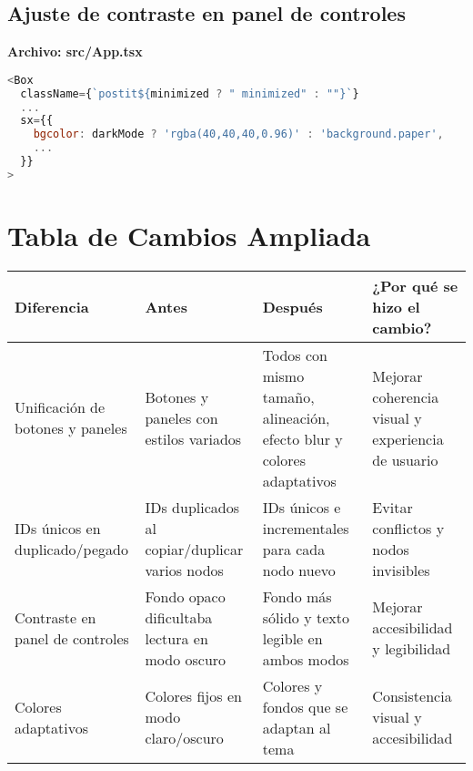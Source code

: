 \documentclass{article}
\begin{document}
\subsection*{Ajuste de contraste en panel de controles}
\textbf{Archivo: src/App.tsx}
\begin{lstlisting}[language=JavaScript, caption=Panel de controles con fondo adaptativo]
<Box
  className={`postit${minimized ? " minimized" : ""}`}
  ...
  sx={{
    bgcolor: darkMode ? 'rgba(40,40,40,0.96)' : 'background.paper',
    ...
  }}
>
\end{lstlisting}

\section*{Tabla de Cambios Ampliada}
\begin{longtable}{|p{3cm}|p{4cm}|p{4cm}|p{4cm}|}
\hline
\textbf{Diferencia} & \textbf{Antes} & \textbf{Después} & \textbf{¿Por qué se hizo el cambio?} \\
\hline
Unificación de botones y paneles & Botones y paneles con estilos variados & Todos con mismo tamaño, alineación, efecto blur y colores adaptativos & Mejorar coherencia visual y experiencia de usuario \\
\hline
IDs únicos en duplicado/pegado & IDs duplicados al copiar/duplicar varios nodos & IDs únicos e incrementales para cada nodo nuevo & Evitar conflictos y nodos invisibles \\
\hline
Contraste en panel de controles & Fondo opaco dificultaba lectura en modo oscuro & Fondo más sólido y texto legible en ambos modos & Mejorar accesibilidad y legibilidad \\
\hline
Colores adaptativos & Colores fijos en modo claro/oscuro & Colores y fondos que se adaptan al tema & Consistencia visual y accesibilidad \\
\hline
\end{longtable}
\end{document}
